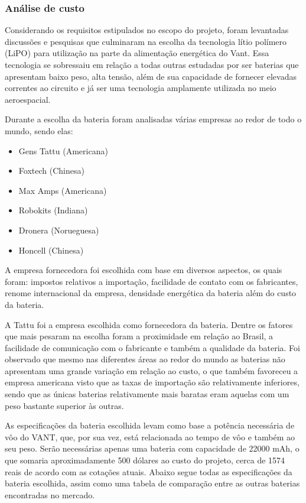 \subsubsection{Análise de custo}
Considerando os requisitos estipulados no escopo do projeto, foram levantadas discussões e pesquisas que culminaram na escolha da tecnologia lítio polímero (LiPO) para utilização na parte da alimentação energética do Vant. Essa tecnologia se sobressaiu em relação a todas outras estudadas por ser baterias que apresentam baixo peso, alta tensão, além de sua capacidade de fornecer elevadas correntes ao circuito e já ser uma tecnologia amplamente utilizada no meio aeroespacial.

Durante a escolha da bateria foram analisadas várias empresas ao redor de todo o mundo, sendo elas:

\begin{itemize}
 
\item Gens Tattu (Americana)

\item Foxtech (Chinesa)

\item Max Amps (Americana)

\item Robokits (Indiana)

\item Dronera (Norueguesa)

\item Honcell (Chinesa)

\end{itemize}

A empresa fornecedora foi escolhida com base em diversos aspectos, os quais foram: impostos relativos a importação, facilidade de contato com os fabricantes, renome internacional da empresa, densidade energética da bateria além do custo da bateria.

A  Tattu foi a empresa escolhida como fornecedora da bateria.  Dentre os fatores que mais pesaram na escolha foram a proximidade em relação ao Brasil, a facilidade de comunicação com o fabricante e também a qualidade da bateria. Foi observado que mesmo nas diferentes áreas ao redor do mundo as baterias não apresentam uma grande variação em relação ao custo, o que também favoreceu a empresa americana visto que as taxas de importação são relativamente inferiores, sendo que as únicas baterias relativamente mais baratas eram aquelas com um peso bastante superior às outras.

As especificações da bateria escolhida levam como base a potência necessária de vôo do VANT, que, por sua vez, está relacionada ao tempo de vôo e também ao seu peso.  Serão necessárias apenas uma bateria com capacidade de 22000 mAh, o que somaria aproximadamente 500 dólares ao custo do projeto, cerca de 1574 reais de acordo com as cotações atuais. Abaixo segue todas as especificações da bateria escolhida, assim como uma tabela de comparação entre as outras baterias encontradas no mercado.


